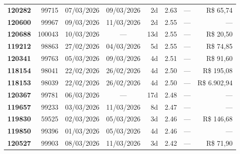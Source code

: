 \documentclass[a4paper,10pt]{article}
\begin{document}
\begin{center}
\begin{longtable}{>{\scriptsize}r>{\scriptsize}r>{\scriptsize}c>{\scriptsize}c>{\scriptsize}r>{\scriptsize}r>{\scriptsize}r>{\scriptsize}r}
\textcolor{anomyellow}{\textbf{120282}} & 99715 & 07/03/2026 & 09/03/2026 & 2d & \textcolor{anomyellow}{2.63} & --- & \textcolor{anomred}{R\$ 65,74} \\

\textcolor{anomyellow}{\textbf{120600}} & 99967 & 09/03/2026 & 11/03/2026 & 2d & \textcolor{anomyellow}{2.55} & --- & --- \\

\textcolor{anomyellow}{\textbf{120688}} & 100043 & 10/03/2026 & — & 13d & \textcolor{anomyellow}{2.55} & --- & \textcolor{anomred}{R\$ 20,50} \\

\textcolor{anomyellow}{\textbf{119212}} & 98863 & 27/02/2026 & 04/03/2026 & 5d & \textcolor{anomyellow}{2.55} & --- & \textcolor{anomred}{R\$ 74,85} \\

\textcolor{anomyellow}{\textbf{120341}} & 99763 & 05/03/2026 & 09/03/2026 & 4d & \textcolor{anomyellow}{2.51} & --- & \textcolor{anomred}{R\$ 91,60} \\

\textcolor{anomyellow}{\textbf{118154}} & 98041 & 22/02/2026 & 26/02/2026 & 4d & \textcolor{anomyellow}{2.50} & --- & \textcolor{anomred}{R\$ 195,08} \\

\textcolor{anomyellow}{\textbf{118153}} & 98039 & 22/02/2026 & 26/02/2026 & 4d & \textcolor{anomyellow}{2.50} & --- & \textcolor{anomred}{R\$ 6.902,94} \\

\textcolor{anomyellow}{\textbf{120367}} & 99781 & 06/03/2026 & — & 17d & \textcolor{anomyellow}{2.48} & --- & --- \\

\textcolor{anomyellow}{\textbf{119657}} & 99233 & 03/03/2026 & 11/03/2026 & 8d & \textcolor{anomyellow}{2.47} & --- & --- \\

\textcolor{anomyellow}{\textbf{119830}} & 59525 & 02/03/2026 & 05/03/2026 & 3d & \textcolor{anomyellow}{2.46} & --- & \textcolor{anomred}{R\$ 146,68} \\

\textcolor{anomyellow}{\textbf{119850}} & 99396 & 01/03/2026 & 05/03/2026 & 4d & \textcolor{anomyellow}{2.46} & --- & --- \\

\textcolor{anomyellow}{\textbf{120527}} & 99903 & 08/03/2026 & 11/03/2026 & 3d & \textcolor{anomyellow}{2.42} & --- & \textcolor{anomred}{R\$ 71,90} \\


\end{longtable}
\end{center}
\end{document}
